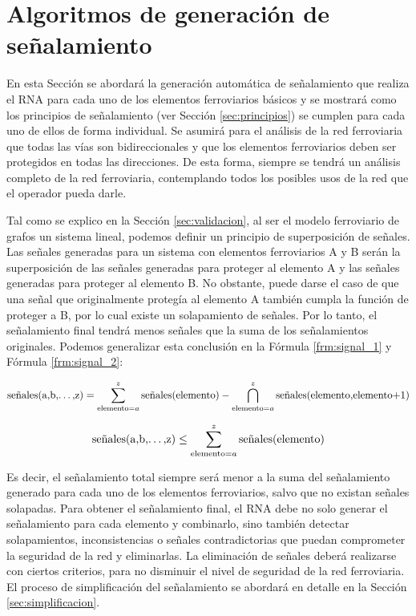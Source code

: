 \section{Algoritmos de generación de señalamiento}
    \label{sec:generacion}
    
    En esta Sección se abordará la generación automática de señalamiento que realiza el RNA para cada uno de los elementos ferroviarios básicos y se mostrará como los principios de señalamiento (ver Sección \ref{sec:principios}) se cumplen para cada uno de ellos de forma individual. Se asumirá para el análisis de la red ferroviaria que todas las vías son bidireccionales y que los elementos ferroviarios deben ser protegidos en todas las direcciones. De esta forma, siempre se tendrá un análisis completo de la red ferroviaria, contemplando todos los posibles usos de la red que el operador pueda darle.
    
    Tal como se explico en la Sección \ref{sec:validacion}, al ser el modelo ferroviario de grafos un sistema lineal, podemos definir un principio de superposición de señales. Las señales generadas para un sistema con elementos ferroviarios A y B serán la superposición de las señales generadas para proteger al elemento A y las señales generadas para proteger al elemento B. No obstante, puede darse el caso de que una señal que originalmente protegía al elemento A también cumpla la función de proteger a B, por lo cual existe un solapamiento de señales. Por lo tanto, el señalamiento final tendrá menos señales que la suma de los señalamientos originales. Podemos generalizar esta conclusión en la Fórmula \ref{frm:signal_1} y Fórmula \ref{frm:signal_2}:

    \begin{equation}
    \text{señales(a,b,\dots,z)} = \sum_{\text{elemento}=a}^{z} \text{señales(elemento)} - \displaystyle\bigcap_{\text{elemento}=a}^{z} \text{señales(elemento,elemento+1)} 
    \label{frm:signal_1}
    \end{equation}

    \begin{equation}
    \text{señales(a,b,\dots,z)} \leq \sum_{\text{elemento}=a}^{z} \text{señales(elemento)} 
    \label{frm:signal_2}
    \end{equation}

    Es decir, el señalamiento total siempre será menor a la suma del señalamiento generado para cada uno de los elementos ferroviarios, salvo que no existan señales solapadas. Para obtener el señalamiento final, el RNA debe no solo generar el señalamiento para cada elemento y combinarlo, sino también detectar solapamientos, inconsistencias o señales contradictorias que puedan comprometer la seguridad de la red y eliminarlas. La eliminación de señales deberá realizarse con ciertos criterios, para no disminuir el nivel de seguridad de la red ferroviaria. El proceso de simplificación del señalamiento se abordará en detalle en la Sección \ref{sec:simplificacion}.

    
    
    
    
    